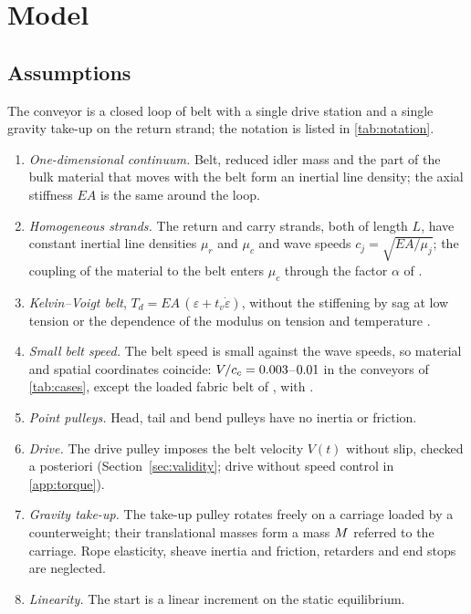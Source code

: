 \section{Model}\label{sec:model}



\subsection{Assumptions}\label{sec:assumptions}

The conveyor is a closed loop of belt with a single drive station and a single gravity
take-up on the return strand; the notation is listed in \cref{tab:notation}.
\begin{enumerate}
  \item[(A1)] \emph{One-dimensional continuum.} Belt, reduced idler mass and the part of the
  bulk material that moves with the belt form an inertial line density; the axial stiffness
  $EA$ is the same around the loop.
  \item[(A2)] \emph{Homogeneous strands.} The return and carry strands, both of length $L$,
  have constant inertial line densities $\mu_r$ and $\mu_c$ and wave speeds
  $c_j=\sqrt{EA/\mu_j}$; the coupling of the material to the belt enters $\mu_c$ through the
  factor $\alpha$ of \citet{lodewijks2002}.
  \item[(A3)] \emph{Kelvin--Voigt belt}, $T_d=EA\,(\varepsilon+t_v\dot\varepsilon)$, without
  the stiffening by sag at low tension \citep{ellis1987} or the dependence of the modulus on
  tension and temperature \citep{zarzycki2023}.
  \item[(A4)] \emph{Small belt speed.} The belt speed is small against the wave speeds, so
  material and spatial coordinates coincide: $V/c_c=0.003$--$0.01$ in
  the conveyors of \cref{tab:cases}, except the loaded fabric belt of
  \citet{lodewijks1996}, with \NumSpeedRatioLo.
  \item[(A5)] \emph{Point pulleys.} Head, tail and bend pulleys have no inertia or friction.
  \item[(A6)] \emph{Drive.} The drive pulley imposes the belt velocity $V(t)$ without slip,
  checked a posteriori (Section~\ref{sec:validity}; drive without speed control in
  \cref{app:torque}).
  \item[(A7)] \emph{Gravity take-up.} The take-up pulley rotates freely on a carriage loaded
  by a counterweight; their translational masses form a mass $M$ referred to the carriage.
  Rope elasticity, sheave inertia and friction, retarders and end stops are neglected.
  \item[(A8)] \emph{Linearity.} The start is a linear increment on the static equilibrium.
\end{enumerate}

